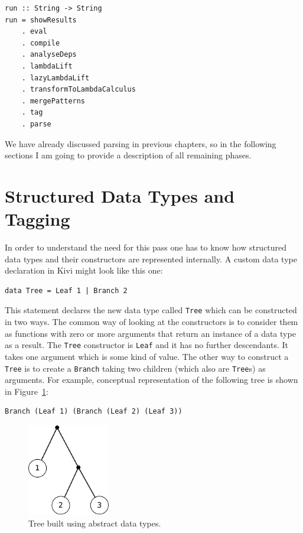 \documentclass[12pt,a4paper]{report}
\begin{document}
\vspace*{0.2in}
\begin{lstlisting}[style=haskell]
run :: String -> String
run = showResults
    . eval
    . compile
    . analyseDeps
    . lambdaLift
    . lazyLambdaLift
    . transformToLambdaCalculus
    . mergePatterns
    . tag
    . parse
\end{lstlisting}

We have already discussed parsing in previous chapters, so in the following
sections I am going to provide a description of all remaining phases.

\section{Structured Data Types and Tagging}
In order to understand the need for this pass one has to know how structured
data types and their constructors are represented internally.
A custom data type declaration in Kivi might look like this one:

\vspace*{0.2in}
\begin{lstlisting}[style=haskell]
data Tree = Leaf 1 | Branch 2
\end{lstlisting}

This statement declares the new data type called \texttt{Tree} which can be
constructed in two ways. The common way of looking at the constructors is to
consider them as functions with zero or more arguments that return an instance
of a data type as a result. The \texttt{Tree} constructor is \texttt{Leaf} and
it has no further descendants. It takes one argument which is some kind of
value. The other way to construct a \texttt{Tree} is to create a \texttt{Branch}
taking two children (which also are \texttt{Tree}s) as arguments. For example,
conceptual representation of the following tree is shown in Figure~\ref{fig:tree}:

\vspace*{0.2in}
\begin{lstlisting}[style=haskell]
Branch (Leaf 1) (Branch (Leaf 2) (Leaf 3))
\end{lstlisting}

\begin{figure}[h!]
  \centering
  \includegraphics[height=4cm]{tree}
  \caption{Tree built using abstract data types.}
  \label{fig:tree}
\end{figure}
\end{document}
